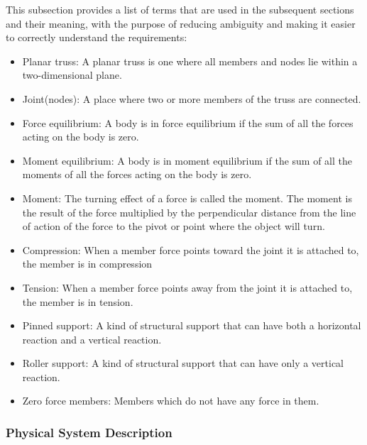 \documentclass[12pt]{article}
\begin{document}
This subsection provides a list of terms that are used in the subsequent
sections and their meaning, with the purpose of reducing ambiguity and making it easier to correctly understand the requirements:

\begin{itemize}

\item{ Planar truss:  A planar truss is one where all members and nodes lie within a two-dimensional plane.} 
\item{Joint(nodes): A place where two or more  members of the truss  are connected.}
\item{Force equilibrium: A body is in force equilibrium if the sum of all the forces acting on the body is zero.}
\item{Moment equilibrium: A body is in moment equilibrium if the sum of all the moments of all the forces acting on the body is zero.}
\item{Moment: The turning effect of a force is called the moment. The moment is the result of the force multiplied by the perpendicular distance from the line of action of the force to the pivot or point where the object will turn.}
\item{Compression: When a member force points toward the joint it is attached to, the member is in compression}
\item{Tension: When a member force points away from the joint it is attached to, the member is in tension.}
\item{Pinned support: A kind of structural support that can have both a horizontal reaction and a vertical reaction. }
\item{Roller support: A kind of structural support that can have only a vertical reaction. }
\item{Zero force members: Members which do not have any force in them.}
\end{itemize}

\subsubsection{Physical System Description} \label{sec_phySystDescrip}

\end{document}
